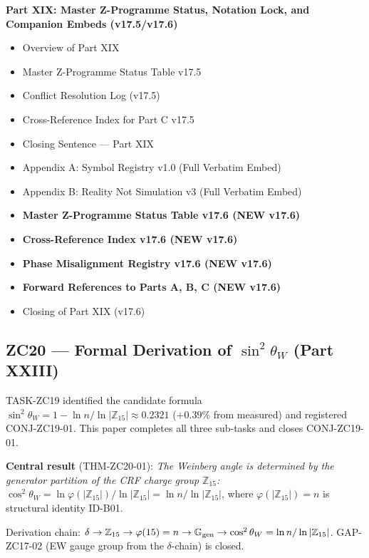 \documentclass[11pt, a4paper]{article}
\newcommand{\swsq}{\sin^2\theta_W}
\newcommand{\cwsq}{\cos^2\theta_W}
\newcommand{\Ztf}{\mathbb{Z}_{15}}
\newcommand{\Ggen}{\mathbb{G}_{\rm gen}}
\begin{document}
\begin{contentsbox}[title={Part D --- Part and Section Headers}]
\textbf{Part XIX: Master Z-Programme Status, Notation Lock, and Companion Embeds (v17.5/v17.6)}
\begin{itemize}[noitemsep,leftmargin=1.5em]
  \item Overview of Part XIX
  \item Master Z-Programme Status Table v17.5
  \item Conflict Resolution Log (v17.5)
  \item Cross-Reference Index for Part C v17.5
  \item Closing Sentence --- Part XIX
  \item Appendix A: Symbol Registry v1.0 (Full Verbatim Embed)
  \item Appendix B: Reality Not Simulation v3 (Full Verbatim Embed)
  \item \textbf{Master Z-Programme Status Table v17.6 (NEW v17.6)}
  \item \textbf{Cross-Reference Index v17.6 (NEW v17.6)}
  \item \textbf{Phase Misalignment Registry v17.6 (NEW v17.6)}
  \item \textbf{Forward References to Parts A, B, C (NEW v17.6)}
  \item Closing of Part XIX (v17.6)
\end{itemize}
\end{contentsbox}

\subsection{ZC20 --- Formal Derivation of $\sin^2\theta_W$ (Part XXIII)}

\begin{zcbox}[title={ZC20: THM-ZC20-01 --- GAP-ZC17-02 Closed}]
\sloppy
TASK-ZC19 identified the candidate formula
$\swsq = 1 - \ln n/\ln|\Ztf| \approx 0.2321$
($+0.39\%$ from measured) and registered CONJ-ZC19-01.
This paper completes all three sub-tasks and closes CONJ-ZC19-01.

\textbf{Central result} (THM-ZC20-01):
\emph{The Weinberg angle is determined by the generator partition
of the CRF charge group $\Ztf$:}
$\cwsq = \ln\varphi(|\Ztf|)/\ln|\Ztf| = \ln n/\ln|\Ztf|$,
where $\varphi(|\Ztf|) = n$ is structural identity ID-B01.

Derivation chain: $\delta \to \mathbb{Z}_{15} \to \varphi(15) = n
\to \Ggen \to \cwsq = \ln n/\ln|\Ztf|$.
GAP-ZC17-02 (EW gauge group from the $\delta$-chain) is closed.
\end{zcbox}
\end{document}
